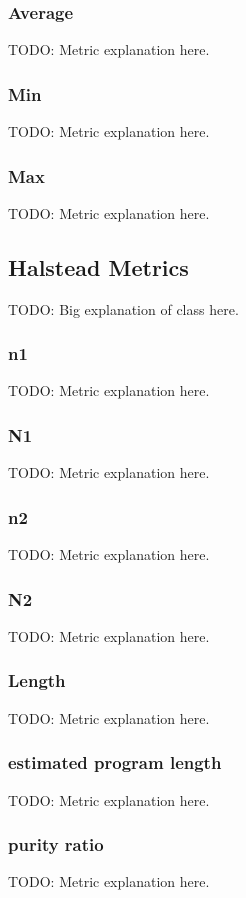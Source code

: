 \subsubsection{Average}
TODO: Metric explanation here.

\subsubsection{Min}
TODO: Metric explanation here.

\subsubsection{Max}
TODO: Metric explanation here.

\subsection{Halstead Metrics}

TODO: Big explanation of class here.

\subsubsection{n1}

TODO: Metric explanation here.

\subsubsection{N1}
TODO: Metric explanation here.
\subsubsection{n2}
TODO: Metric explanation here.
\subsubsection{N2}
TODO: Metric explanation here.
\subsubsection{Length}
TODO: Metric explanation here.
\subsubsection{estimated program length}
TODO: Metric explanation here.
\subsubsection{purity ratio}
TODO: Metric explanation here.
